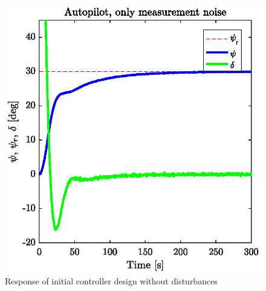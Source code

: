 \begin{figure}[h]
	\centering
	\includegraphics[width=\textwidth]{figures/Ass3_b_only_noise_old.eps}
	\caption{Response of initial controller design without disturbances}
\label{fig:p5p3b_OLD}
\end{figure}